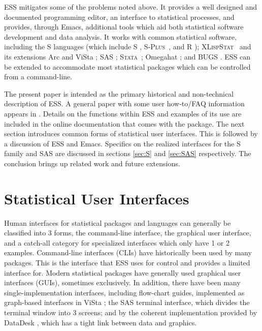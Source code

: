 \documentclass{article}
\newcommand*{\Splus}{\textsc{S-Plus}}
\newcommand*{\XLispStat}{\textsc{XLispStat}}
\newcommand*{\Stata}{\textsc{Stata}}
\begin{document}
ESS mitigates some of the problems noted above.  It provides a well
designed and documented programming editor, an interface to
statistical processes, and provides, through Emacs, additional tools
which aid both statistical software development and data analysis.  It
works with common statistical software, including the S languages
(which include S \citep{BecRCW88,ChaJH92,ChaJ98}, \Splus\ 
\citep{Splus}, and R \citep{ihak:gent:1996}); \XLispStat\ 
\citep{Tier90} and its extensions Arc \citep{Cook:Weisberg:1999} and
ViSta \citep{youn:fald:mcfa:1992}; SAS \citep{SAS:8.0}; \Stata\ 
\citep{Stata:6.0}; Omegahat \citep{DTLang:2000}; and BUGS
\citep{SpieThomBest:1999}.  ESS can be extended to accommodate most
statistical packages which can be controlled from a command-line.

The present paper is intended as the primary historical and
non-technical description of ESS.  A general paper with some user
how-to/FAQ information appears in \citep{heiberger:dsc:2001}.  Details
on the functions within ESS and examples of its use are included in
the online documentation that comes with the package.  The next
section introduces common forms of statistical user interfaces.  This
is followed by a discussion of ESS and Emacs.  Specifics on the
realized interfaces for the S family and SAS are discussed in sections
\ref{sec:S} and \ref{sec:SAS} respectively.  The conclusion
brings up related work and future extensions.

\section{Statistical User Interfaces}
\label{sec:UI}

Human interfaces for statistical packages and languages can generally
be classified into 3 forms, the command-line interface, the graphical
user interface, and a catch-all category for specialized interfaces
which only have 1 or 2 examples.  Command-line interfaces (CLIs) have
historically been used by many packages.  This is the interface that
ESS uses for control and provides a limited interface for.  Modern
statistical packages have generally used graphical user interfaces
(GUIs), sometimes exclusively.  In addition, there have been many
single-implementation interfaces, including flow-chart guides,
implemented as graph-based interfaces in ViSta \citep{youn:lubi:1995};
the SAS terminal interface, which divides the terminal window into 3
screens; and by the coherent implementation provided by DataDesk
\citep{vell:prat:1989}, which has a tight link between data and
graphics.
\end{document}
